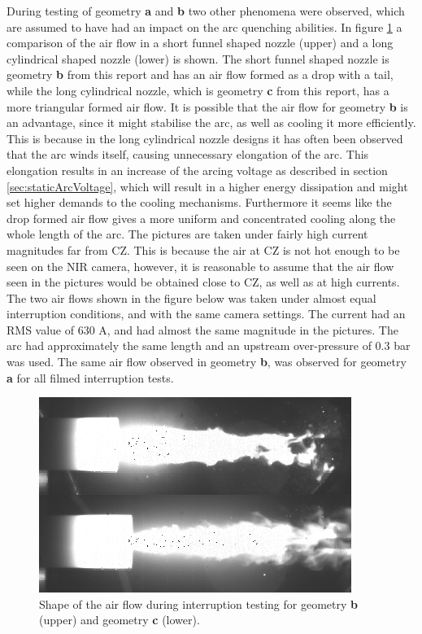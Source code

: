 \documentclass[10pt,b5paper,twoside]{article}
\begin{document}
During testing of geometry \textbf{a} and \textbf{b} two other phenomena were observed, which are assumed to have had an impact on the arc quenching abilities. In figure \ref{fig:funnelDisp} a comparison of the air flow in a short funnel shaped nozzle (upper) and a long cylindrical shaped nozzle (lower) is shown. The short funnel shaped nozzle is geometry \textbf{b} from this report and has an air flow formed as a drop with a tail, while the long cylindrical nozzle, which is geometry \textbf{c} from this report, has a more triangular formed air flow. It is possible that the air flow for geometry \textbf{b} is an advantage, since it might stabilise the arc, as well as cooling it more efficiently. This is because in the long cylindrical nozzle designs it has often been observed that the arc winds itself, causing unnecessary elongation of the arc. This elongation results in an increase of the arcing voltage as described in section \ref{sec:staticArcVoltage}, which will result in a higher energy dissipation and might set higher demands to the cooling mechanisms. Furthermore it seems like the drop formed air flow gives a more uniform and concentrated cooling along the whole length of the arc. The pictures are taken under fairly high current magnitudes far from CZ. This is because the air at CZ is not hot enough to be seen on the NIR camera, however, it is reasonable to assume that the air flow seen in the pictures would be obtained close to CZ, as well as at high currents. The two air flows shown in the figure below was taken under almost equal interruption conditions, and with the same camera settings. The current had an RMS value of 630 A, and had almost the same magnitude in the pictures. The arc had approximately the same length and an upstream over-pressure of 0.3 bar was used. The same air flow observed in geometry \textbf{b}, was observed for geometry \textbf{a} for all filmed interruption tests.

\begin{figure}[H]
\centering
\includegraphics[scale=0.75]{Bilder/Results/compFunnelNormal.png}
\caption{Shape of the air flow during interruption testing for geometry \textbf{b} (upper) and geometry \textbf{c} (lower).} \label{fig:funnelDisp}
\end{figure}
\end{document}
